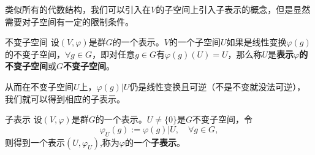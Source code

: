 类似所有的代数结构，我们可以引入在$V$的子空间上引入子表示的概念，但是显然需要对子空间有一定的限制条件。

\begin{definition}{不变子空间}
设$(V,\varphi)$是群$G$的一个表示。$V$的一个子空间$U$如果是线性变换$\varphi(g)$的不变子空间，$\forall g\in G$，即对任意$g\in G$有$\varphi(g)(U)=U$，那么称$U$是\textbf{表示$\varphi$的不变子空间}或\textbf{$G$不变子空间}。
\end{definition}

从而在不变子空间$U$上，$\varphi(g)|U$仍是线性变换且可逆（不是不变就没法可逆），我们就可以得到相应的子表示。

\begin{definition}{子表示}
设$(V,\varphi)$是群$G$的一个表示。$U\neq\{0\}$是$G$不变子空间，令
\begin{equation}
\varphi_U(g) := \varphi(g)|U,\quad\forall g\in G,
\end{equation}
则得到一个表示$(U,\varphi_U)$,称为$\varphi$的一个\textbf{子表示}。
\end{definition}
